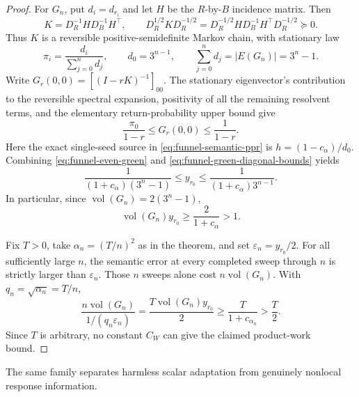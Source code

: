 \begin{proof}
For $G_n$, put $d_i=d_{r_i}$ and let $H$ be the $R$-by-$B$ incidence matrix.
Then
\begin{equation*}
 K=D_R^{-1}H D_B^{-1}H^\top,
 \qquad
 D_R^{1/2}KD_R^{-1/2}
 =D_R^{-1/2}H D_B^{-1}H^\top D_R^{-1/2}\succeq0.
\end{equation*}
Thus $K$ is a reversible positive-semidefinite Markov chain, with stationary
law
\begin{equation*}
 \pi_i=\frac{d_i}{\sum_{j=0}^n d_j},
 \qquad
 d_0=3^{n-1},
 \qquad
 \sum_{j=0}^n d_j=|E(G_n)|=3^n-1.
\end{equation*}
Write $G_r(0,0)=[(I-rK)^{-1}]_{00}$.  The stationary eigenvector's
contribution to the reversible spectral expansion, positivity of all the
remaining resolvent terms, and the elementary return-probability upper bound
give
\begin{equation}
 \frac{\pi_0}{1-r}\leq G_r(0,0)\leq\frac1{1-r}.
 \label{eq:funnel-green-diagonal-bounds}
\end{equation}
Here the exact single-seed source in
\eqref{eq:funnel-semantic-ppr} is
$h=(1-c_\alpha)/d_0$.  Combining
\eqref{eq:funnel-even-green} and
\eqref{eq:funnel-green-diagonal-bounds} yields
\begin{equation}
 \frac1{(1+c_\alpha)(3^n-1)}
 \leq y_{r_0}
 \leq\frac1{(1+c_\alpha)3^{n-1}}.
 \label{eq:funnel-seed-output-scale}
\end{equation}
In particular, since
$\operatorname{vol}(G_n)=2(3^n-1)$,
\begin{equation*}
 \operatorname{vol}(G_n)y_{r_0}\geq\frac2{1+c_\alpha}>1.
\end{equation*}

Fix $T>0$, take $\alpha_n=(T/n)^2$ as in the theorem, and set
$\varepsilon_n=y_{r_0}/2$.  For all sufficiently large $n$, the semantic
error at every completed sweep through $n$ is strictly larger than
$\varepsilon_n$.  Those $n$ sweeps alone cost
$n\operatorname{vol}(G_n)$.  With $q_n=\sqrt{\alpha_n}=T/n$,
\begin{equation*}
 \frac{n\operatorname{vol}(G_n)}{1/(q_n\varepsilon_n)}
 =\frac{T\operatorname{vol}(G_n)y_{r_0}}2
 \geq\frac{T}{1+c_{\alpha_n}}>\frac T2.
\end{equation*}
Since $T$ is arbitrary, no constant $C_W$ can give the claimed product-work
bound.
\end{proof}

The same family separates harmless scalar adaptation from genuinely nonlocal
response information.

